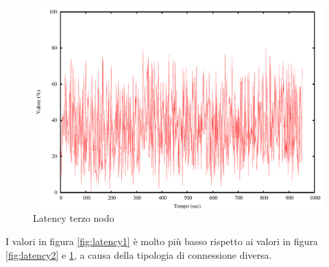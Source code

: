 \begin{figure}[H]
\begin{center}
\includegraphics[scale=0.6]{etc/latency3.pdf}
\caption{Latency terzo nodo}
\label{fig:latency3}
\end{center}
\end{figure}
I valori in figura \ref{fig:latency1} è molto più basso rispetto ai valori in figura \ref{fig:latency2} e \ref{fig:latency3}, a causa della tipologia di connessione diversa.

